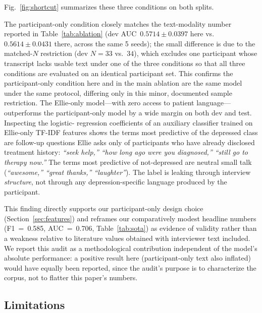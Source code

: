 \documentclass[journal]{IEEEtran}
\begin{document}
\noindent Fig.~\ref{fig:shortcut} summarizes these three conditions on
both splits.

The participant-only condition closely matches the text-modality
number reported in Table~\ref{tab:ablation} (dev
AUC~$0.5714\pm0.0397$ here vs.\ $0.5614\pm0.0431$ there, across the
same 5 seeds); the small difference is due to the matched-$N$
restriction (dev $N{=}33$ vs.\ $34$), which excludes one participant
whose transcript lacks usable text under one of the three conditions
so that all three conditions are evaluated on an identical
participant set. This confirms the participant-only condition here
and in the main ablation are the same model under the same protocol,
differing only in this minor, documented sample restriction. The
Ellie-only model---with
zero access to patient language---outperforms the participant-only
model by a wide margin on both dev and test. Inspecting the logistic-
regression coefficients of an auxiliary classifier trained on Ellie-only
TF-IDF features shows the terms most predictive of the depressed class
are follow-up questions Ellie asks only of participants who have
already disclosed treatment history: \emph{``seek help,'' ``how long ago
were you diagnosed,'' ``still go to therapy now.''} The terms most
predictive of not-depressed are neutral small talk (\emph{``awesome,''
``great thanks,'' ``laughter''}). The label is leaking through interview
\emph{structure}, not through any depression-specific language produced
by the participant.

This finding directly supports our participant-only design choice
(Section~\ref{sec:features}) and reframes our comparatively modest
headline numbers (F1~=~0.585, AUC~=~0.706, Table~\ref{tab:sota}) as
evidence of validity rather than a weakness relative to literature
values obtained with interviewer text included. We report this
audit as a methodological contribution independent of the model's
absolute performance: a positive result here (participant-only text
also inflated) would have equally been reported, since the audit's
purpose is to characterize the corpus, not to flatter this paper's
numbers.

\subsection{Limitations}
\label{subsec:limitations}
\end{document}

